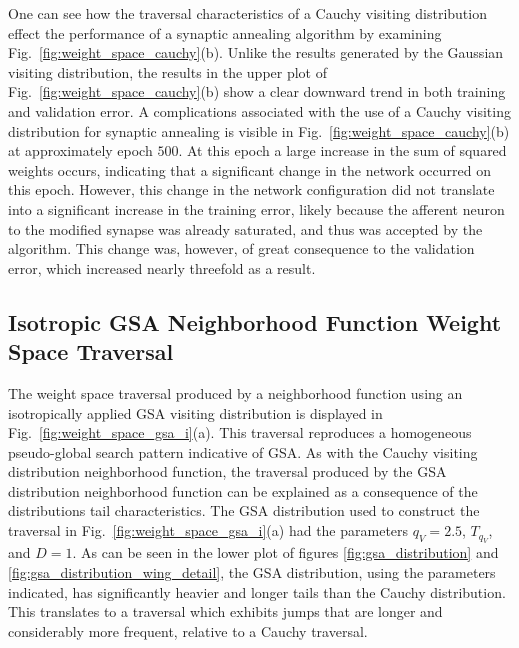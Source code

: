 \documentclass[11pt]{afthesis}
\begin{document}
  	One can see how the traversal characteristics of a Cauchy visiting distribution effect the performance of a synaptic annealing algorithm by examining Fig.~\ref{fig:weight_space_cauchy}(b). Unlike the results generated by the Gaussian visiting distribution, the results in the upper plot of Fig.~\ref{fig:weight_space_cauchy}(b) show a clear downward trend in both training and validation error.	A complications associated with the use of a Cauchy visiting distribution for synaptic annealing is visible in Fig.~\ref{fig:weight_space_cauchy}(b) at approximately epoch $500$. At this epoch a large increase in the sum of squared weights occurs, indicating that a significant change in the network occurred on this epoch. However, this change in the network configuration did not translate into a significant increase in the training error, likely because the afferent neuron to the modified synapse was already saturated, and thus was accepted by the algorithm. This change was, however, of great consequence to the validation error, which increased nearly threefold as a result. 

	\subsection{Isotropic GSA Neighborhood Function Weight Space Traversal} 

	The weight space traversal produced by a neighborhood function using an isotropically applied GSA visiting distribution is displayed in Fig.~\ref{fig:weight_space_gsa_i}(a). This traversal reproduces a homogeneous pseudo-global search pattern indicative of GSA. As with the Cauchy visiting distribution neighborhood function, the traversal produced by the GSA distribution neighborhood function can be explained as a consequence of the distributions tail characteristics. The GSA distribution used to construct the traversal in Fig.~\ref{fig:weight_space_gsa_i}(a) had the parameters $q_V=2.5$, $T_{q_V}$, and $D=1$. As can be seen in the lower plot of figures \ref{fig:gsa_distribution} and \ref{fig:gsa_distribution_wing_detail}, the GSA distribution, using the parameters indicated, has significantly heavier and longer tails than the Cauchy distribution. This translates to a traversal which exhibits jumps that are longer and considerably more frequent, relative to a Cauchy traversal.   
	 
\end{document}
